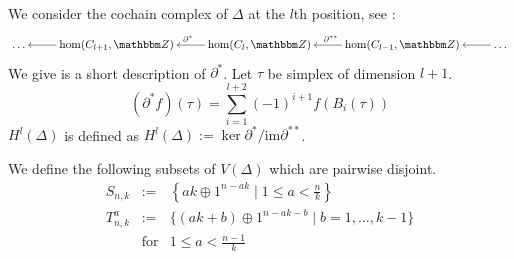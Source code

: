 \documentclass{elsarticle}
\def\Z{\mathbbm Z}
\def\im{\textrm{im}}
\begin{document}
We consider the cochain complex of $\Delta$ at the $l$th position, see \cite[Section 3.1]{hatcher}:
\[
\xymatrix{
\dots&\hom(C_{l+1},\Z)\ar[l]&\hom(C_l,\Z)\ar[l]_{\partial^*}&\hom(C_{l-1},\Z)\ar[l]_{\partial^{**}}&\dots\ar[l]
}
\]
We give is a short description of $\partial^*$. Let $\tau$ be simplex of dimension $l+1$.
\[
(\partial^*f)(\tau)=\sum_{i=1}^{l+2}(-1)^{i+1}f(B_i(\tau))
\]
$H^l(\Delta)$ is defined as $H^l(\Delta):=\ker\partial^*/\im\partial^{**}$.

We define the following subsets of $V(\Delta)$ which are pairwise disjoint.
\begin{eqnarray*}
S_{n,k}&:=&\left\{ak\oplus 1^{n-ak}\mid 1\leq a<\frac nk\right\}\\
T_{n,k}^a&:=&\{(ak+b)\oplus 1^{n-ak-b}\mid b=1,\dots,k-1\}\\
&\text{for}&1\leq a<\frac {n-1}k
\end{eqnarray*}
\end{document}
